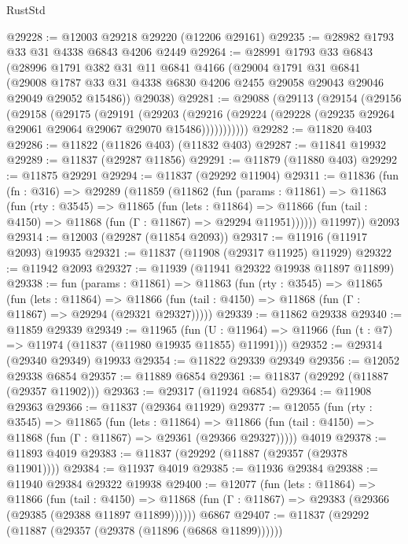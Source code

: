 \begin{lexlean}{RustStd}
\begin{coremodule}
@29228 := @12003 @29218 @29220 (@12206 @29161)
@29235 := @28982 @1793 @33 @31 @4338 @6843 @4206 @2449
@29264 := @28991
    @1793
    @33
    @6843
    (@28996
      @1791
      @382
      @31
      @11
      @6841
      @4166
      (@29004
        @1791
        @31
        @6841
        (@29008 @1787 @33 @31 @4338 @6830 @4206 @2455 @29058 @29043 @29046 @29049 @29052 @15486))
      @29038)
@29281 := @29088
    (@29113
      (@29154
        (@29156
          (@29158
            (@29175
              (@29191
                (@29203
                  (@29216
                    (@29224 (@29228 (@29235 @29264 @29061 @29064 @29067 @29070 @15486)))))))))))
@29282 := @11820 @403
@29286 := @11822 (@11826 @403) (@11832 @403)
@29287 := @11841 @19932
@29289 := @11837 (@29287 @11856)
@29291 := @11879 (@11880 @403)
@29292 := @11875 @29291
@29294 := @11837 (@29292 @11904)
@29311 := @11836
    (fun (fn : @316) =>
    @29289
      (@11859
        (@11862
          (fun (params : @11861) =>
          @11863
            (fun (rty : @3545) =>
            @11865
              (fun (lets : @11864) =>
              @11866 (fun (tail : @4150) => @11868 (fun (Γ : @11867) => @29294 @11951))))))
        @11997))
    @2093
@29314 := @12003 (@29287 (@11854 @2093))
@29317 := @11916 (@11917 @2093) @19935
@29321 := @11837 (@11908 (@29317 @11925) @11929)
@29322 := @11942 @2093
@29327 := @11939 (@11941 @29322 @19938 @11897 @11899)
@29338 := fun (params : @11861) =>
  @11863
    (fun (rty : @3545) =>
    @11865
      (fun (lets : @11864) =>
      @11866 (fun (tail : @4150) => @11868 (fun (Γ : @11867) => @29294 (@29321 @29327)))))
@29339 := @11862 @29338
@29340 := @11859 @29339
@29349 := @11965
    (fun (U : @11964) => @11966 (fun (t : @7) => @11974 (@11837 (@11980 @19935 @11855) @11991)))
@29352 := @29314 (@29340 @29349) @19933
@29354 := @11822 @29339 @29349
@29356 := @12052 @29338 @6854
@29357 := @11889 @6854
@29361 := @11837 (@29292 (@11887 (@29357 @11902)))
@29363 := @29317 (@11924 @6854)
@29364 := @11908 @29363
@29366 := @11837 (@29364 @11929)
@29377 := @12055
    (fun (rty : @3545) =>
    @11865
      (fun (lets : @11864) =>
      @11866 (fun (tail : @4150) => @11868 (fun (Γ : @11867) => @29361 (@29366 @29327)))))
    @4019
@29378 := @11893 @4019
@29383 := @11837 (@29292 (@11887 (@29357 (@29378 @11901))))
@29384 := @11937 @4019
@29385 := @11936 @29384
@29388 := @11940 @29384 @29322 @19938
@29400 := @12077
    (fun (lets : @11864) =>
    @11866
      (fun (tail : @4150) =>
      @11868 (fun (Γ : @11867) => @29383 (@29366 (@29385 (@29388 @11897 @11899))))))
    @6867
@29407 := @11837 (@29292 (@11887 (@29357 (@29378 (@11896 (@6868 @11899))))))

\end{coremodule}
\end{lexlean}
